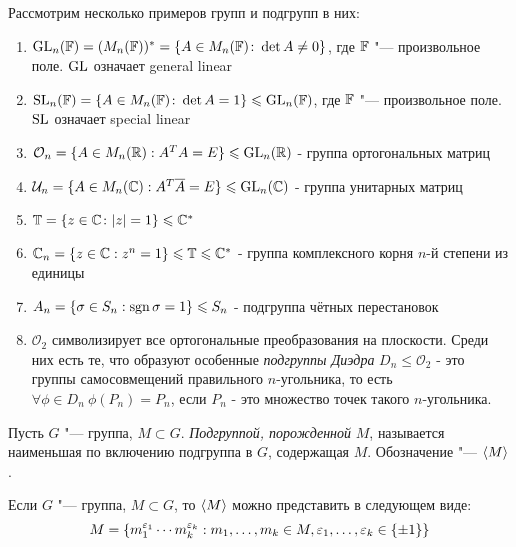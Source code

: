 \begin{example}
	Рассмотрим несколько примеров групп и подгрупп в них:
	\begin{enumerate}
		\item $\operatorname{GL}_n(\mathbb{F}) = (M_n(\mathbb{F}))^* = \{A \in M_n(\mathbb{F}) \colon \det{A} \ne 0\}$, где $\mathbb{F}$ "--- произвольное поле. $\operatorname{GL}$ означает general linear
		
		\item $\operatorname{SL}_n(\mathbb{F}) = \{A \in M_n(\mathbb{F}) \colon \det A = 1\} \leqslant \operatorname{GL}_n(\mathbb{F})$, где $\mathbb{F}$ "--- произвольное поле. $\operatorname{SL}$ означает special linear
		
		\item $\mathcal{O}_n = \{A \in M_n(\mathbb{R}): A^TA = E\} \leqslant \operatorname{GL}_n(\mathbb{R})$ - группа ортогональных матриц
		
		\item $\mathcal{U}_n = \{A \in M_n(\mathbb{C}): A^T\overline{A} = E\} \leqslant \operatorname{GL}_n(\mathbb{C})$ - группа унитарных матриц
		
		\item $\mathbb{T} = \{z \in \mathbb{C} \colon |z| = 1\} \leqslant \mathbb{C}^*$
		
		\item $\mathbb{C}_n = \{z \in \mathbb{C}: z^n = 1\} \leqslant \mathbb{T} \leqslant \mathbb{C}^*$ - группа комплексного корня $n$-й степени из единицы
		
		\item $A_n = \{\sigma \in S_n: \operatorname{\mathop{sgn}}\sigma = 1\} \leqslant S_n$ - подгруппа чётных перестановок
		
		\item $\mathcal{O}_2$ символизирует все ортогональные преобразования на плоскости. Среди них есть те, что образуют особенные \textit{подгруппы Диэдра} $D_n \le \mathcal{O}_2$ - это группы самосовмещений правильного $n$-угольника, то есть $\forall \phi \in D_n\ \phi(P_n) = P_n$, если $P_n$ - это множество точек такого $n$-угольника.
	\end{enumerate}
\end{example}

\begin{definition}
	Пусть $G$ "--- группа, $M \subset G$. \textit{Подгруппой, порожденной} $M$, называется наименьшая по включению подгруппа в $G$, содержащая $M$. Обозначение "--- $\langle M\rangle$.
\end{definition}

\begin{reminder}
	Если $G$ "--- группа, $M \subset G$, то $\left\langle M\right\rangle$ можно представить в следующем виде:
	\[
		M = \{m_1^{\epsilon_1}\dotsm m_k^{\epsilon_k}: m_1, \dotsc, m_k \hm\in M, \epsilon_1, \dotsc, \epsilon_k \in \{\pm1\}\}
	\]
\end{reminder}

